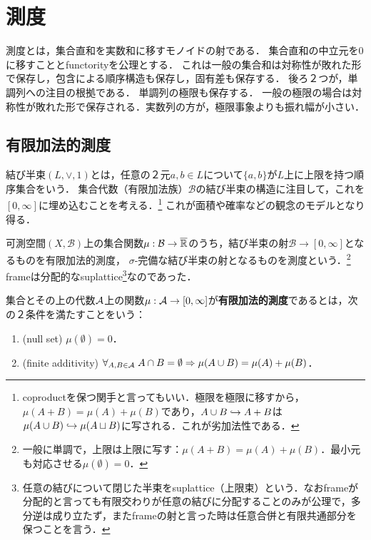 \documentclass[uplatex, dvipdfmx]{jsreport}
\renewcommand{\B}{\mathcal{B}}
\begin{document}
\section{測度}

\begin{tcolorbox}[colframe=ForestGreen, colback=ForestGreen!10!white,breakable,colbacktitle=ForestGreen!40!white,coltitle=black,fonttitle=\bfseries\sffamily,
title=]
    測度とは，集合直和を実数和に移すモノイドの射である．
    集合直和の中立元を$0$に移すこととfunctorityを公理とする．
    これは一般の集合和は対称性が敗れた形で保存し，包含による順序構造も保存し，固有差も保存する．
    後ろ２つが，単調列への注目の根拠である．
    単調列の極限も保存する．
    一般の極限の場合は対称性が敗れた形で保存される．実数列の方が，極限事象よりも振れ幅が小さい．
\end{tcolorbox}

\subsection{有限加法的測度}

\begin{tcolorbox}[colframe=ForestGreen, colback=ForestGreen!10!white,breakable,colbacktitle=ForestGreen!40!white,coltitle=black,fonttitle=\bfseries\sffamily,
title=単に結び半束の射ではなさそう．極限を保つ束の関手と言った方が良いか．]
    結び半束$(L,\lor,1)$とは，任意の２元$a,b\in L$について$\{a,b\}$が$L$上に上限を持つ順序集合をいう．
    集合代数（有限加法族）$\B$の結び半束の構造に注目して，これを$[0,\infty]$に埋め込むことを考える．\footnote{coproductを保つ関手と言ってもいい．極限を極限に移すから，$\mu(A+B)=\mu(A)+\mu(B)$であり，$A\cup B\hookrightarrow A+B$は$\mu(A\cup B)\hookrightarrow\mu(A\sqcup B)$に写される．これが劣加法性である．}
    これが面積や確率などの観念のモデルとなり得る．

    可測空間$(X,\B)$上の集合関数$\mu:\B\to\o{\R}$のうち，結び半束の射$\B\to[0,\infty]$となるものを有限加法的測度，
    $\sigma$-完備な結び半束の射となるものを測度という．\footnote{一般に単調で，上限は上限に写す：$\mu(A+B)=\mu(A)+\mu(B)$．最小元も対応させる$\mu(\emptyset)=0$．}
    frameは分配的なsuplattice\footnote{任意の結びについて閉じた半束をsuplattice（上限束）という．なおframeが分配的と言っても有限交わりが任意の結びに分配することのみが公理で，多分逆は成り立たず，またframeの射と言った時は任意合併と有限共通部分を保つことを言う．}なのであった．
\end{tcolorbox}

\begin{definition}
    集合とその上の代数$\mathcal{A}$上の関数$\mu:\mathcal{A}\to[0,\infty]$が\textbf{有限加法的測度}であるとは，次の２条件を満たすことをいう：
    \begin{enumerate}
        \item (null set) $\mu(\emptyset)=0$．
        \item (finite additivity) $\forall_{A,B\in\mathcal{A}}\;A\cap B=\emptyset\Rightarrow\mu(A\cup B)=\mu(A)+\mu(B)$．
    \end{enumerate}
\end{definition}
\end{document}
